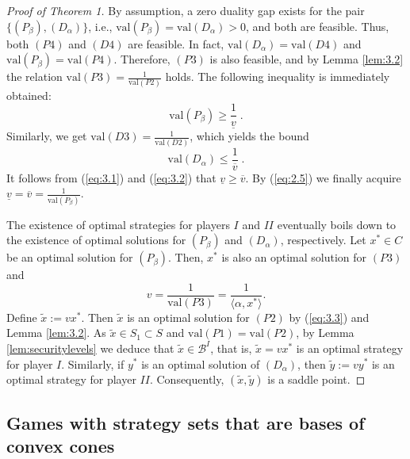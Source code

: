 \documentclass[11pt, twoside]{article}
\numberwithin{equation}{section}
\theoremstyle{definition}
\begin{document}
\begin{proof}[Proof of Theorem 1]
 By assumption, a zero duality gap exists for the pair \hyperlink{newprimaldual}{$\{(P_\beta),(D_\alpha)\}$}, i.e., $\text{val}(P_\beta)=\text{val}(D_\alpha)>0$, and both are feasible. Thus, both \hyperlink{p4}{$(P4)$} and \hyperlink{d4}{$(D4)$} are feasible. In fact, $\text{val}(D_\alpha)=\text{val}(D4)$ and $\text{val}(P_\beta)=\text{val}(P4)$. Therefore, \hyperlink{p3}{$(P3)$} is also feasible, and by Lemma \ref{lem:3.2} the relation $\text{val}(P3)=\frac{1}{\text{val}(P2)}$ holds. The following inequality is immediately obtained:
\begin{equation}\label{eq:3.1}
    \text{val}(P_\beta)\geq\displaystyle\frac{1}{\underline{v}}\;.
\end{equation} 
Similarly, we get $\text{val}(D3)=\frac{1}{\text{val}(D2)}$, which yields the bound
\begin{equation}\label{eq:3.2}
    \text{val}(D_\alpha)\leq \displaystyle\frac{1}{\overline{v}}\; .
\end{equation}
It follows from (\ref{eq:3.1}) and (\ref{eq:3.2}) that $\underline{v}\geq\overline{v}$. By (\ref{eq:2.5}) we finally acquire $\underline{v}=\overline{v}=\frac{1}{\text{val}(P_\beta)}$.\par

 The existence of optimal strategies for players $I$ and $II$ eventually boils down to the existence of optimal solutions for \hyperlink{primalbeta}{$(P_\beta)$} and \hyperlink{dualalpha}{$(D_\alpha)$}, respectively. Let $x^*\in C$ be an optimal solution for \hyperlink{primalbeta}{$(P_\beta)$}. Then, $x^*$ is also an optimal solution for \hyperlink{p3}{$(P3)$} and
\begin{equation}\label{eq:3.3}
   v=\displaystyle\frac{1}{\text{val}(P3)}=\frac{1}{\langle \alpha,x^*\rangle}. 
\end{equation}
Define $\widetilde{x}:=  vx^* $. Then $\widetilde{x}$ is an optimal solution for \hyperlink{p2}{$(P2)$} by (\ref{eq:3.3}) and Lemma \ref{lem:3.2}. As $\widetilde{x}\in S_1\subset S$ and $\text{val}(P1)=\text{val}(P2)$, by Lemma \ref{lem:securitylevels} we deduce that $\widetilde{x}\in\mathcal{B}^{I}$, that is, $\widetilde{x}=vx^*$ is an optimal strategy for player $I$. Similarly, if $y^*$ is an optimal solution of \hyperlink{dualalpha}{$(D_\alpha)$}, then $\widetilde{y}:=  vy^*$ is an optimal strategy for player $II$. Consequently, $(\widetilde{x},\widetilde{y})$ is a saddle point.
\end{proof}

 
\vspace{-0.1cm}\subsection{Games with strategy sets that are bases of convex cones}\label{sec:3.2}\vspace{-0.2cm}
\end{document}
